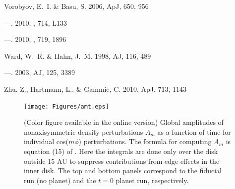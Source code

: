 \documentclass[12pt,manuscript,authoryear]{aastex}
\begin{document}
\begin{thebibliography}{48}
{Vorobyov}, E.~I. \& {Basu}, S. 2006, ApJ, 650, 956

---. 2010{}, \apjl, 714, L133

---. 2010{}, \apj, 719, 1896

{Ward}, W.~R. \& {Hahn}, J.~M. 1998, AJ, 116, 489

---. 2003, AJ, 125, 3389

{Zhu}, Z., {Hartmann}, L., \& {Gammie}, C. 2010, ApJ, 713, 1143

\end{thebibliography}

\newpage

\begin{figure}[t]
\center
\texttt{[image: Figures/amt.eps]}
\caption{(Color figure available in the online version) Global amplitudes of nonaxisymmetric density perturbations $A_m$
  as a function of time for individual cos($m\phi$) perturbations. The formula for computing $A_m$ is equation (15) of
  \citep{boley2006}. Here the integrals are done only over the disk outside 15 AU to suppress contributions from edge
  effects in the inner disk. The top and bottom panels correspond to the fiducial run (no planet) and the $t = 0$ planet
  run, respectively.}
\label{fig:Am}
\end{figure}
\end{document}
